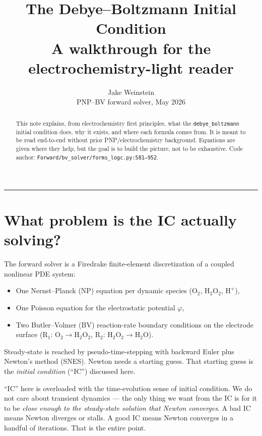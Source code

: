 \documentclass[11pt]{article}
\title{The Debye--Boltzmann Initial Condition\\[2pt]
{\large A walkthrough for the electrochemistry-light reader}}
\author{Jake Weinstein \\ \small PNP--BV forward solver, May 2026}
\date{}
\begin{document}
\maketitle

\begin{abstract}
\noindent
This note explains, from electrochemistry first principles, what the
\texttt{debye\_boltzmann} initial condition does, why it exists, and
where each formula comes from. It is meant to be read end-to-end
without prior PNP/electrochemistry background. Equations are given
where they help, but the goal is to build the picture, not to be
exhaustive. Code anchor:
\texttt{Forward/bv\_solver/forms\_logc.py:581--952}.
\end{abstract}

\tableofcontents
\vspace{1em}\hrule\vspace{1em}

\section{What problem is the IC actually solving?}

The forward solver is a Firedrake finite-element discretization of a
coupled nonlinear PDE system:
\begin{itemize}
\item One Nernst--Planck (NP) equation per dynamic species
      ($\mathrm{O_2}$, $\mathrm{H_2O_2}$, $\mathrm{H^+}$),
\item One Poisson equation for the electrostatic potential $\varphi$,
\item Two Butler--Volmer (BV) reaction-rate boundary conditions on the
      electrode surface (R$_1$: $\mathrm{O_2}\to\mathrm{H_2O_2}$,
      R$_2$: $\mathrm{H_2O_2}\to\mathrm{H_2O}$).
\end{itemize}

Steady-state is reached by pseudo-time-stepping with backward Euler
plus Newton's method (SNES). Newton needs a starting guess. That
starting guess is the \emph{initial condition} (``IC'') discussed
here.

\begin{tcolorbox}[notebox, title={A point of vocabulary}]
``IC'' here is overloaded with the time-evolution sense of initial
condition. We do not care about transient dynamics --- the only thing
we want from the IC is for it to be \emph{close enough to the
steady-state solution that Newton converges}. A bad IC means Newton
diverges or stalls. A good IC means Newton converges in a handful of
iterations. That is the entire point.
\end{tcolorbox}
\end{document}
